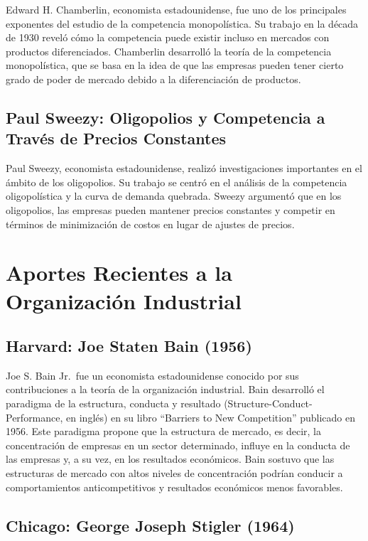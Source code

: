 \documentclass[
  doc,
  floatsintext,
  longtable,
  a4paper,
  nolmodern,
  notxfonts,
  notimes,
  colorlinks=true,linkcolor=blue,citecolor=blue,urlcolor=blue]{apa7}
\begin{document}
Edward H. Chamberlin, economista estadounidense, fue uno de los
principales exponentes del estudio de la competencia monopolística. Su
trabajo en la década de 1930 reveló cómo la competencia puede existir
incluso en mercados con productos diferenciados. Chamberlin desarrolló
la teoría de la competencia monopolística, que se basa en la idea de que
las empresas pueden tener cierto grado de poder de mercado debido a la
diferenciación de productos.

\subsection{Paul Sweezy: Oligopolios y Competencia a Través de Precios
Constantes}\label{paul-sweezy-oligopolios-y-competencia-a-travuxe9s-de-precios-constantes}

Paul Sweezy, economista estadounidense, realizó investigaciones
importantes en el ámbito de los oligopolios. Su trabajo se centró en el
análisis de la competencia oligopolística y la curva de demanda
quebrada. Sweezy argumentó que en los oligopolios, las empresas pueden
mantener precios constantes y competir en términos de minimización de
costos en lugar de ajustes de precios.

\section{Aportes Recientes a la Organización
Industrial}\label{aportes-recientes-a-la-organizaciuxf3n-industrial}

\subsection{Harvard: Joe Staten Bain
(1956)}\label{harvard-joe-staten-bain-1956}

Joe S. Bain Jr.~fue un economista estadounidense conocido por sus
contribuciones a la teoría de la organización industrial. Bain
desarrolló el paradigma de la estructura, conducta y resultado
(Structure-Conduct-Performance, en inglés) en su libro ``Barriers to New
Competition'' publicado en 1956. Este paradigma propone que la
estructura de mercado, es decir, la concentración de empresas en un
sector determinado, influye en la conducta de las empresas y, a su vez,
en los resultados económicos. Bain sostuvo que las estructuras de
mercado con altos niveles de concentración podrían conducir a
comportamientos anticompetitivos y resultados económicos menos
favorables.

\subsection{Chicago: George Joseph Stigler
(1964)}\label{chicago-george-joseph-stigler-1964}
\end{document}
